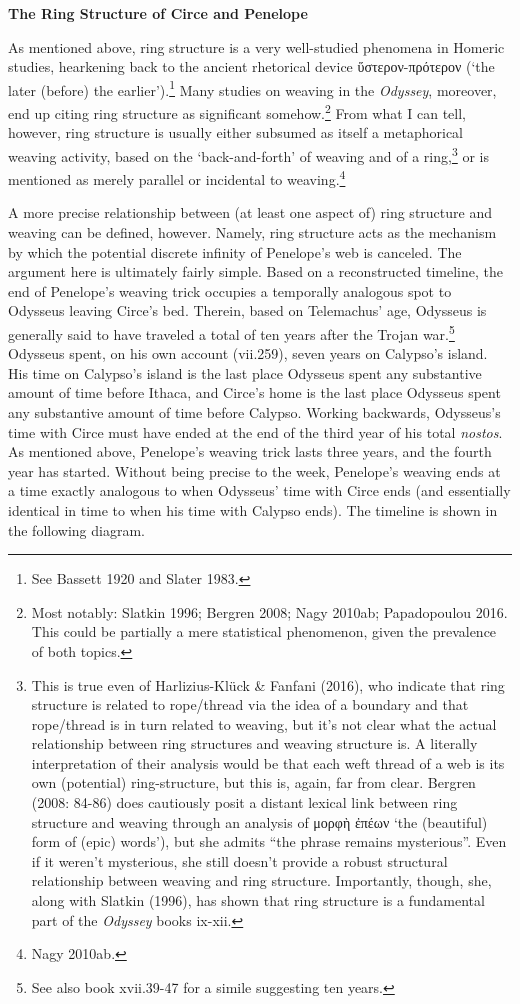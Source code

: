 \documentclass[12pt]{article}
\begin{document}
\noindent \hfill \par
\noindent \textbf{The Ring Structure of Circe and Penelope}

As mentioned above, ring structure is a very well-studied phenomena in Homeric studies, hearkening back to the ancient rhetorical device ὕστερον-πρότερον (`the later (before) the earlier').\footnote{ See Bassett 1920 and Slater 1983.} Many studies on weaving in the \textit{Odyssey}, moreover, end up citing ring structure as significant somehow.\footnote{ Most notably: Slatkin 1996; Bergren 2008; Nagy 2010ab; Papadopoulou 2016. This could be partially a mere statistical phenomenon, given the prevalence of both topics.} From what I can tell, however, ring structure is usually either subsumed as itself a metaphorical weaving activity, based on the `back-and-forth' of weaving and of a ring,\footnote{ This is true even of Harlizius-Kl\"{u}ck \& Fanfani (2016), who indicate that ring structure is related to rope/thread via the idea of a boundary and that rope/thread is in turn related to weaving, but it's not clear what the actual relationship between ring structures and weaving structure is. A literally interpretation of their analysis would be that each weft thread of a web is its own (potential) ring-structure, but this is, again, far from clear. Bergren (2008: 84-86) does cautiously posit a distant lexical link between ring structure and weaving through an analysis of μορφὴ ἐπέων `the (beautiful) form of (epic) words'), but she admits ``the phrase remains mysterious''. Even if it weren't mysterious, she still doesn't provide a robust structural relationship between weaving and ring structure. Importantly, though, she, along with Slatkin (1996), has shown that ring structure is a fundamental part of the \textit{Odyssey} books ix-xii.} or is mentioned as merely parallel or incidental to weaving.\footnote{ Nagy 2010ab.}

A more precise relationship between (at least one aspect of) ring structure and weaving can be defined, however. Namely, ring structure acts as the mechanism by which the potential discrete infinity of Penelope's web is canceled. The argument here is ultimately fairly simple. Based on a reconstructed timeline, the end of Penelope's weaving trick occupies a temporally analogous spot to Odysseus leaving Circe's bed. Therein, based on Telemachus' age, Odysseus is generally said to have traveled a total of ten years after the Trojan war.\footnote{ See also book xvii.39-47 for a simile suggesting ten years.} Odysseus spent, on his own account (vii.259), seven years on Calypso's island. His time on Calypso's island is the last place Odysseus spent any substantive amount of time before Ithaca, and Circe's home is the last place Odysseus spent any substantive amount of time before Calypso. Working backwards, Odysseus's time with Circe must have ended at the end of the third year of his total \textit{nostos}. As mentioned above, Penelope's weaving trick lasts three years, and the fourth year has started. Without being precise to the week, Penelope's weaving ends at a time exactly analogous to when Odysseus' time with Circe ends (and essentially identical in time to when his time with Calypso ends). The timeline is shown in the following diagram.
\end{document}
